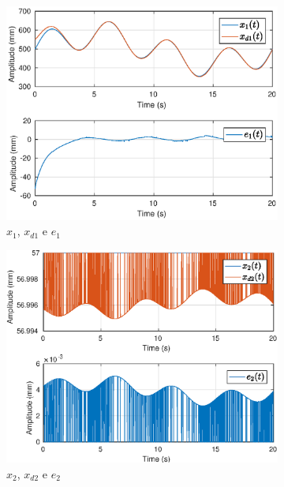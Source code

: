 \begin{figure}[!ht]
\centering
\begin{subfigure}{.5\textwidth}
  \centering
  \includegraphics[width=\linewidth]{./img/trk1/x1.eps}
  \caption{$x_1$, $x_{d1}$ e $e_1$}
  \label{fig:sub1}
\end{subfigure}%
\begin{subfigure}{.5\textwidth}
  \centering
  \includegraphics[width=\linewidth]{./img/trk1/x2.eps}
  \caption{$x_2$, $x_{d2}$ e $e_2$}
  \label{fig:sub2}
\end{subfigure}
\begin{subfigure}{.5\textwidth}
  \centering

\end{subfigure}
\end{figure}
